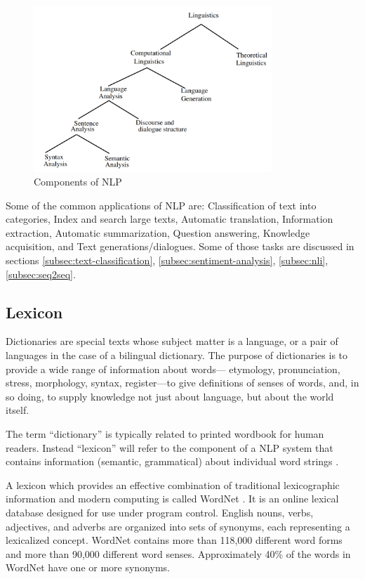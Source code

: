 \begin{figure}[H]
    \centering
    \includegraphics[width=0.8\textwidth]{images/2_1_nlp_components.png}
    \caption{Components of NLP}\label{fig:nlp_components}
\end{figure}
    

Some of the common applications of NLP are: Classification of text into categories, Index and search large texts, Automatic translation, Information extraction,
Automatic summarization, Question answering, Knowledge acquisition, and Text
generations/dialogues.
Some of those tasks are discussed in sections \ref{subsec:text-classification}, \ref{subsec:sentiment-analysis}, \ref{subsec:nli}, \ref{subsec:seq2seq}.


\subsection{Lexicon}\label{subsec:lexicon}
Dictionaries are special texts whose subject matter is
a language, or a pair of languages in the case of a
bilingual dictionary. The purpose of dictionaries is to
provide a wide range of information about words---
etymology, pronunciation, stress, morphology, syntax, register---to give definitions of senses of words,
and, in so doing, to supply knowledge not just about
language, but about the world itself.

The term “dictionary” is typically related to printed wordbook for human readers. 
Instead “\gls{lexicon}” will refer to the component of
a NLP system that contains information (semantic,
grammatical) about individual word strings \cite{Guthrie_ComACM96}.

A lexicon which provides an effective combination of traditional
lexicographic information and modern computing is called WordNet \cite{miller1995wordnet}.
It is an online lexical database designed for use under program control. English nouns, verbs,
adjectives, and adverbs are organized into sets of synonyms, each representing
a lexicalized concept. WordNet contains more than 118,000 different word
forms and more than 90,000 different word senses. Approximately 40\% of
the words in WordNet have one or more synonyms.

